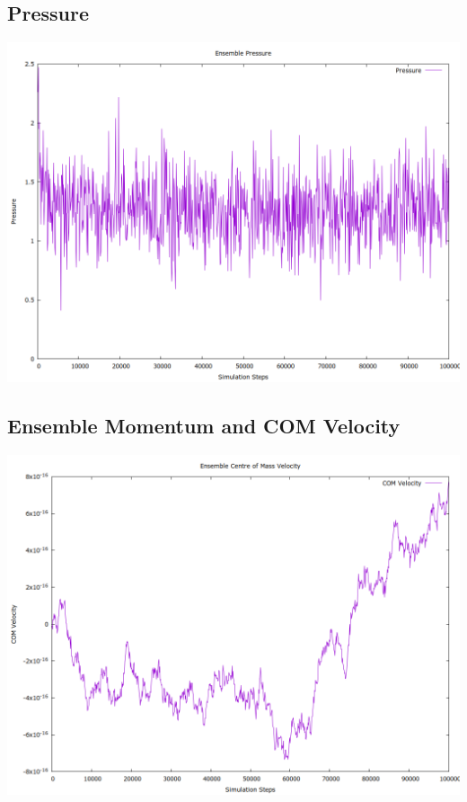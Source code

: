\documentclass[a4paper,11pt,twoside]{article}
\begin{document}
\subsection{Pressure}
\label{sec:org568d20d}
\begin{center}
\includegraphics[width=.9\linewidth]{../../runs/nve_lammps_pair_style/plots/pressure.png}
\end{center}
\subsection{Ensemble Momentum and COM Velocity}
\label{sec:org693b4ab}
\begin{center}
\includegraphics[width=.9\linewidth]{../../runs/nve_lammps_pair_style/plots/com_velocity.png}
\end{center}
\end{document}
